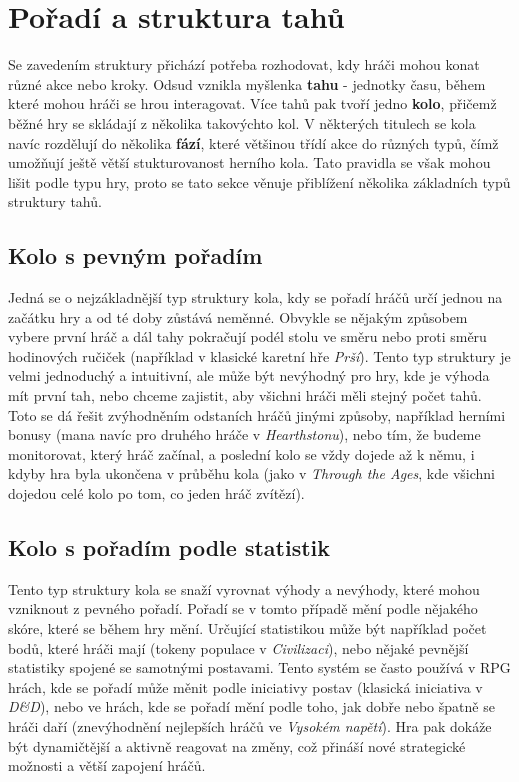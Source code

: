 
\section{Pořadí a struktura tahů}
\label{sec:turns}

Se zavedením struktury přichází potřeba rozhodovat, kdy hráči mohou konat různé akce nebo kroky. Odsud vznikla myšlenka \textbf{tahu} - jednotky času, během které mohou hráči se hrou interagovat. Více tahů pak tvoří jedno \textbf{kolo}, přičemž běžné hry se skládají z několika takovýchto kol. V některých titulech se kola navíc rozdělují do několika \textbf{fází}, které většinou třídí akce do různých typů, čímž umožňují ještě větší stukturovanost herního kola. Tato pravidla se však mohou lišit podle typu hry, proto se tato sekce věnuje přiblížení několika základních typů struktury tahů.

\subsection{Kolo s pevným pořadím}
\label{subsec:turns_fixed_order}

Jedná se o nejzákladnější typ struktury kola, kdy se pořadí hráčů určí jednou na začátku hry a od té doby zůstává neměnné. Obvykle se nějakým způsobem vybere první hráč a dál tahy pokračují podél stolu ve směru nebo proti směru hodinových ručiček (například v klasické karetní hře \textit{Prší}). Tento typ struktury je velmi jednoduchý a intuitivní, ale může být nevýhodný pro hry, kde je výhoda mít první tah, nebo chceme zajistit, aby všichni hráči měli stejný počet tahů. Toto se dá řešit zvýhodněním odstaních hráčů jinými způsoby, například herními bonusy (mana navíc pro druhého hráče v \textit{Hearthstonu}), nebo tím, že budeme monitorovat, který hráč začínal, a poslední kolo se vždy dojede až k němu, i kdyby hra byla ukončena v průběhu kola (jako v \textit{Through the Ages}, kde všichni dojedou celé kolo po tom, co jeden hráč zvítězí).

\subsection{Kolo s pořadím podle statistik}
\label{subsec:turns_stat_order}

Tento typ struktury kola se snaží vyrovnat výhody a nevýhody, které mohou vzniknout z pevného pořadí. Pořadí se v tomto případě mění podle nějakého skóre, které se během hry mění. Určující statistikou může být například počet bodů, které hráči mají (tokeny populace v \textit{Civilizaci}), nebo nějaké pevnější statistiky spojené se samotnými postavami. Tento systém se často používá v RPG hrách, kde se pořadí může měnit podle iniciativy postav (klasická iniciativa v \textit{D\&D}), nebo ve hrách, kde se pořadí mění podle toho, jak dobře nebo špatně se hráči daří (znevýhodnění nejlepších hráčů ve \textit{Vysokém napětí}). Hra pak dokáže být dynamičtější a aktivně reagovat na změny, což přináší nové strategické možnosti a větší zapojení hráčů.


